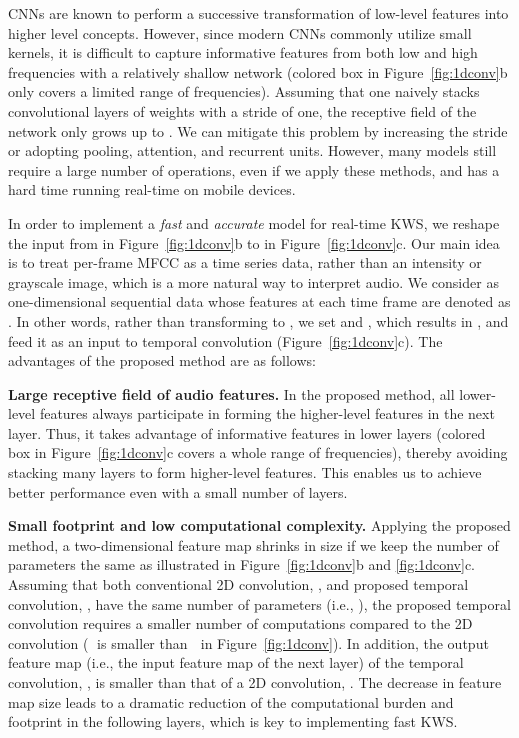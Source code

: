 \documentclass[a4paper]{article}
\begin{document}
CNNs are known to perform a successive transformation of low-level features into higher level concepts.
However, since modern CNNs commonly utilize small kernels, it is difficult to capture informative features from both low and high frequencies with a relatively shallow network (colored box in Figure~\ref{fig:1dconv}b only covers a limited range of frequencies).
Assuming that one naively stacks  convolutional layers of  weights with a stride of one, the receptive field of the network only grows up to .
We can mitigate this problem by increasing the stride or adopting pooling, attention, and recurrent units.
However, many models still require a large number of operations, even if we apply these methods, and has a hard time running real-time on mobile devices.

In order to implement a \emph{fast} and \emph{accurate} model for real-time KWS, we reshape the input from  in Figure~\ref{fig:1dconv}b to  in Figure~\ref{fig:1dconv}c.
Our main idea is to treat per-frame MFCC as a time series data, rather than an intensity or grayscale image, which is a more natural way to interpret audio.
We consider  as one-dimensional sequential data whose features at each time frame are denoted as .
In other words, rather than transforming  to , we set  and , which results in , and feed it as an input to temporal convolution (Figure~\ref{fig:1dconv}c). 
The advantages of the proposed method are as follows:

\textbf{Large receptive field of audio features.} 
In the proposed method, all lower-level features always participate in forming the higher-level features in the next layer.
Thus, it takes advantage of informative features in lower layers (colored box in Figure~\ref{fig:1dconv}c covers a whole range of frequencies), thereby avoiding stacking many layers to form higher-level features.
This enables us to achieve better performance even with a small number of layers.

\textbf{Small footprint and low computational complexity.} 
Applying the proposed method, a two-dimensional feature map shrinks in size if we keep the number of parameters the same as illustrated in Figure~\ref{fig:1dconv}b and \ref{fig:1dconv}c.
Assuming that both conventional 2D convolution, , and proposed temporal convolution, , have the same number of parameters (i.e., ), the proposed temporal convolution requires a smaller number of computations compared to the 2D convolution (\textcircled{\raisebox{-0.9pt}{2}} is smaller than \textcircled{\raisebox{-0.9pt}{1}} in Figure~\ref{fig:1dconv}).
In addition, the output feature map (i.e., the input feature map of the next layer) of the temporal convolution, , is smaller than that of a 2D convolution, .
The decrease in feature map size leads to a dramatic reduction of the computational burden and footprint in the following layers, which is key to implementing fast KWS.
\end{document}

